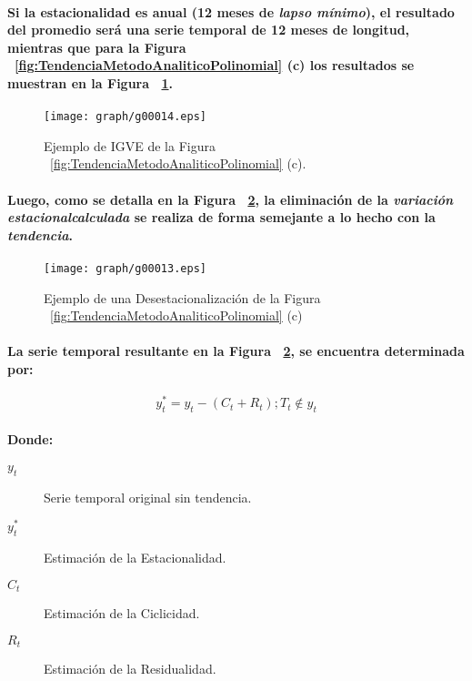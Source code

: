 \paragraph{
Si la estacionalidad es anual (12 meses de \emph{lapso mínimo}), el resultado del promedio será una serie temporal de 12 meses de longitud, mientras que para la Figura ~\ref{fig:TendenciaMetodoAnaliticoPolinomial} (c) los resultados se muestran en la Figura ~\ref{fig:DesestacionalizacionIGVE}.
}
\begin{figure}[hb]
\centering
\texttt{[image: graph/g00014.eps]}
\caption[IGVE]{Ejemplo de IGVE de la Figura ~\ref{fig:TendenciaMetodoAnaliticoPolinomial} (c).}
\label{fig:DesestacionalizacionIGVE}
\end{figure}
\paragraph*{
Luego, como se detalla en la Figura ~\ref{fig:Desestacionalizacion}, la eliminación de la \emph{variación estacional\footnotemark[4] calculada} se realiza de forma semejante a lo hecho con la \emph{tendencia}.
}
\begin{figure}[hb]
\centering
\texttt{[image: graph/g00013.eps]}
\caption[Desestacionalización]{Ejemplo de una Desestacionalización de la Figura ~\ref{fig:TendenciaMetodoAnaliticoPolinomial} (c)}
\label{fig:Desestacionalizacion}
\end{figure}
\paragraph{
La serie temporal resultante en la Figura ~\ref{fig:Desestacionalizacion}, se encuentra determinada por:
}
\begin{equation}
y_t^* = y_t - (C_t + R_t); T_t \not \in y_t
\end{equation}
\paragraph{
Donde:
}
\begin{description}
\item[$y_t$] Serie temporal original sin tendencia.
\item[$y_t^*$] Estimación de la Estacionalidad.
\item[$C_t$] Estimación de la Ciclicidad.
\item[$R_t$] Estimación de la Residualidad.
\end{description}
